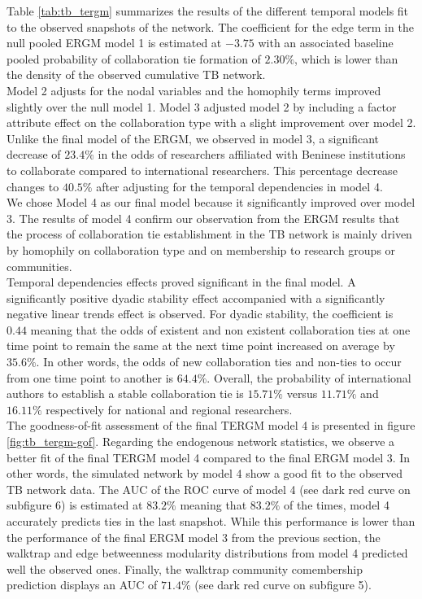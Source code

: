 Table \ref{tab:tb_tergm} summarizes the results of the different temporal models fit to the observed snapshots of the network. The coefficient for the edge term in the null pooled ERGM model 1 is estimated at $-3.75$ with an associated baseline pooled probability of collaboration tie formation of $2.30\%$, which is lower than the density of the observed cumulative TB network.\\
Model 2 adjusts for the nodal variables and the homophily terms improved slightly over the null model 1. Model 3 adjusted model 2 by including a factor attribute effect on the collaboration type with a slight improvement over model 2. Unlike the final model of the ERGM, we observed in model 3, a significant decrease of $23.4\%$ in the odds of researchers affiliated with Beninese institutions to collaborate compared to international researchers. This percentage decrease changes to $40.5\%$ after adjusting for the temporal dependencies in model 4. \\
We chose Model 4 as our final model because it significantly improved over model 3. The results of model 4 confirm our observation from the ERGM results that the process of collaboration tie establishment in the TB network is mainly driven by homophily on collaboration type and on membership to research groups or communities. \\
Temporal dependencies effects proved significant in the final model. A significantly positive dyadic stability effect accompanied with a significantly negative linear trends effect is observed. For dyadic stability, the coefficient is $0.44$ meaning that the odds of existent and non existent collaboration ties at one time point to remain the same at the next time point increased on average by $35.6\%$. In other words, the odds of new collaboration ties and non-ties to occur from one time point to another is $64.4\%$. Overall, the probability of international authors to establish a stable collaboration tie is $15.71\%$ versus $11.71\%$ and $16.11\%$ respectively for national and regional researchers.\\
The goodness-of-fit assessment of the final TERGM model 4 is presented in figure \ref{fig:tb_tergm-gof}. Regarding the endogenous network statistics, we observe a better fit of the final TERGM model 4 compared to the final ERGM model 3. In other words, the simulated network by model 4 show a good fit to the observed TB network data. The AUC of the ROC curve of model 4 (see dark red curve on subfigure 6) is estimated at $83.2\%$ meaning that $83.2\%$ of the times, model 4 accurately predicts ties in the last snapshot. While this performance is lower than the performance of the final ERGM model 3 from the previous section, the walktrap and edge betweenness modularity distributions from model 4 predicted well the observed ones. Finally, the walktrap community comembership prediction displays an AUC of $71.4\%$ (see dark red curve on subfigure 5).

